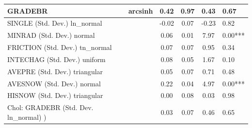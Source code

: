 \begin{table}
\begin{center}
\begin{tabular}{|l|l|c|c|c|l|}
			\hline
			GRADEBR & arcsinh & 0.42 & 0.97 & 0.43 & 0.67 \\
			\hline
			SINGLE (Std. Dev.) ln_normal &  & -0.02 & 0.07 & -0.23 & 0.82 \\
			\hline
			MINRAD (Std. Dev.) normal &  & 0.06 & 0.01 & 7.97 & 0.00*** \\
			\hline
			FRICTION (Std. Dev.) tn_normal &  & 0.07 & 0.07 & 0.95 & 0.34 \\
			\hline
			INTECHAG (Std. Dev.) uniform &  & 0.08 & 0.05 & 1.67 & 0.10 \\
			\hline
			AVEPRE (Std. Dev.) triangular &  & 0.05 & 0.07 & 0.71 & 0.48 \\
			\hline
			AVESNOW (Std. Dev.) normal &  & 0.22 & 0.04 & 4.97 & 0.00*** \\
			\hline
			HISNOW (Std. Dev.) triangular &  & 0.00 & 0.08 & 0.03 & 0.98 \\
			\hline
			 Chol: GRADEBR (Std. Dev. ln_normal) ) &  & 0.03 & 0.07 & 0.46 & 0.65 \\
			\hline
		\end{tabular}
	\end{center}
\end{table}